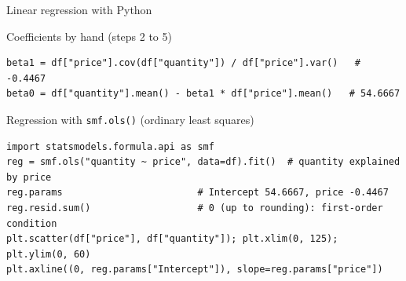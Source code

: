 \documentclass[aspectratio=169,11pt]{beamer}
\begin{document}
\begin{frame}[fragile]{Linear regression with Python}
  \lstset{aboveskip=2pt,belowskip=2pt}
  \vspace{-4pt}
  \begin{block}{Coefficients by hand (steps 2 to 5)}
\begin{lstlisting}
beta1 = df["price"].cov(df["quantity"]) / df["price"].var()   # -0.4467
beta0 = df["quantity"].mean() - beta1 * df["price"].mean()   # 54.6667
\end{lstlisting}
  \end{block}

  \begin{block}{Regression with \texttt{smf.ols()} (ordinary least squares)}
\begin{lstlisting}
import statsmodels.formula.api as smf
reg = smf.ols("quantity ~ price", data=df).fit()  # quantity explained by price
reg.params                        # Intercept 54.6667, price -0.4467
reg.resid.sum()                   # 0 (up to rounding): first-order condition
plt.scatter(df["price"], df["quantity"]); plt.xlim(0, 125); plt.ylim(0, 60)
plt.axline((0, reg.params["Intercept"]), slope=reg.params["price"])
\end{lstlisting}
  \end{block}
\end{frame}
\end{document}

